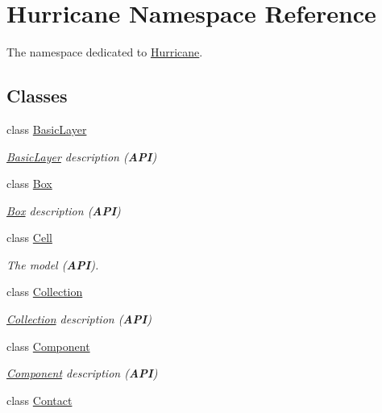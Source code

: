 \hypertarget{namespaceHurricane}{}\section{Hurricane Namespace Reference}
\label{namespaceHurricane}


The namespace dedicated to \mbox{\hyperlink{namespaceHurricane}{Hurricane}}.  


\subsection*{Classes}
\begin{DoxyCompactItemize}
\item 
class \mbox{\hyperlink{classHurricane_1_1BasicLayer}{Basic\+Layer}}
\begin{DoxyCompactList}\small\item\em \mbox{\hyperlink{classHurricane_1_1BasicLayer}{Basic\+Layer}} description ({\bfseries A\+PI}) \end{DoxyCompactList}\item 
class \mbox{\hyperlink{classHurricane_1_1Box}{Box}}
\begin{DoxyCompactList}\small\item\em \mbox{\hyperlink{classHurricane_1_1Box}{Box}} description ({\bfseries A\+PI}) \end{DoxyCompactList}\item 
class \mbox{\hyperlink{classHurricane_1_1Cell}{Cell}}
\begin{DoxyCompactList}\small\item\em The model ({\bfseries A\+PI}). \end{DoxyCompactList}\item 
class \mbox{\hyperlink{classHurricane_1_1Collection}{Collection}}
\begin{DoxyCompactList}\small\item\em \mbox{\hyperlink{classHurricane_1_1Collection}{Collection}} description ({\bfseries A\+PI}) \end{DoxyCompactList}\item 
class \mbox{\hyperlink{classHurricane_1_1Component}{Component}}
\begin{DoxyCompactList}\small\item\em \mbox{\hyperlink{classHurricane_1_1Component}{Component}} description ({\bfseries A\+PI}) \end{DoxyCompactList}\item 
class \mbox{\hyperlink{classHurricane_1_1Contact}{Contact}}

\end{DoxyCompactItemize}
